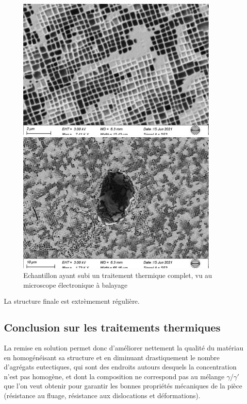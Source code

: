 \begin{figure}[htbp]
    \centering
    \begin{minipage}{0.45\textwidth}
        \includegraphics[width=0.9\textwidth]{images_meb/TTH1914.pdf}
    \end{minipage}%
    \begin{minipage}{0.45\textwidth}
        \includegraphics[width=0.9\textwidth]{images_meb/TTH1915.pdf}
    \end{minipage}%
    \caption{Echantillon ayant subi un traitement thermique complet, 
    vu au microscope électronique à balayage}
    \label{fig:complet_MEB}
\end{figure}


La structure finale est extrèmement régulière.\\


\subsection*{Conclusion sur les traitements thermiques}


La remise en solution permet donc d'améliorer nettement la qualité du matériau en
homogénéisant sa structure et en diminuant drastiquement le nombre d'agrégats
eutectiques, qui sont des endroits autours desquels la concentration n'est pas 
homogène, et dont la composition ne correspond pas au mélange $\gamma$/$\gamma'$
que l'on veut obtenir pour garantir les bonnes propriétés mécaniques de la pièce 
(résistance au fluage, résistance aux dislocations et déformations).



